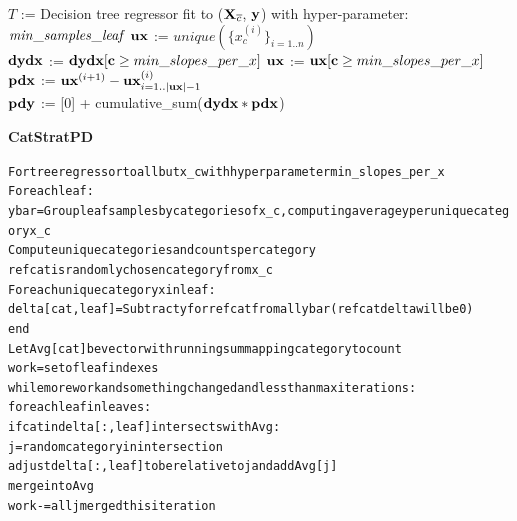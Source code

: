 \documentclass{article}
\newcommand{\xnc}{${\bf X}_{\overline{c}}$}
\begin{document}
\setlength{\algomargin}{5pt}
\begin{algorithm}[]
\DontPrintSemicolon
{}
\SetAlgoSkip{}
$T$ := Decision tree regressor fit to (\xnc{}, $\bf y$) with hyper-parameter: ${\it min\_samples\_leaf}$\;
$\bf ux$ := $unique(\{x_c^{(i)}\}_{i=1..n})$\\
${\bf dydx}$ := ${\bf dydx}[{\bf c} \ge min\_slopes\_per\_x]$
${\bf ux}$ := ${\bf ux}[{\bf c} \ge min\_slopes\_per\_x]$\\
$\bf pdx$ := ${\bf ux}^{(i+1)} - {\bf ux}^{(i)}_{i=1..|{\bf ux}|-1}$\\
$\bf pdy$ := [0] + cumulative\_sum(${\bf dydx} * \bf pdx$)~~~
\label{alg:CatStratPD}
\end{algorithm}

\pagebreak

{\bf CatStratPD}\begin{alltt}\small
For tree regressor to all but x_c with hyper parameter min_slopes_per_x
For each leaf:
    y bar = Group leaf samples by categories of x_c, computing average y per unique category x_c
    Compute unique categories and counts per category
    refcat is randomly chosen category from x_c
    For each unique category x in leaf:
        delta[cat,leaf] = Subtract y for refcat from all y bar (refcat delta will be 0)
end
Let Avg[cat] be vector with running sum mapping category to count
work = set of leaf indexes
while more work and something changed and less than max iterations:
    for each leaf in leaves:
        if cat in delta[:,leaf] intersects with Avg:
            j = random category in intersection
            adjust delta[:,leaf] to be relative to j and add Avg[j]
            merge into Avg
    work -= all j merged this iteration
\end{alltt}
\end{document}
